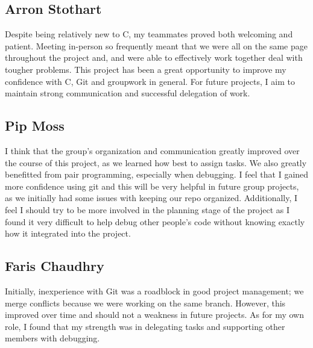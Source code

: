 \documentclass[11pt]{article}
\begin{document}
\subsection{Arron Stothart}
Despite being relatively new to C, my teammates proved both welcoming and patient. Meeting in-person so frequently meant that we were all on the same page throughout the project and, and were able to effectively work together deal with tougher problems. This project has been a great opportunity to improve my confidence with C, Git and groupwork in general. For future projects, I aim to maintain strong communication and successful delegation of work.

\subsection{Pip Moss}
I think that the group's organization and communication greatly improved over the course of this project, as we learned how best to assign tasks. We also greatly benefitted from pair programming, especially when debugging. I feel that I gained more confidence using git and this will be very helpful in future group projects, as we initially had some issues with keeping our repo organized. Additionally, I feel I should try to be more involved in the planning stage of the project as I found it very difficult to help debug other people's code without knowing exactly how it integrated into the project.


\subsection{Faris Chaudhry}
Initially, inexperience with Git was a roadblock in good project management; we merge conflicts because we were working on the same branch. However, this improved over time and should not a weakness in future projects. As for my own role, I found that my strength was in delegating tasks and supporting other members with debugging. 
\end{document}
